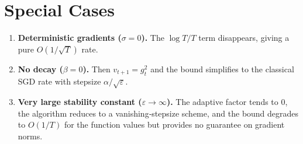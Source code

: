 \documentclass{article}
\begin{document}
\section*{Special Cases}
\begin{enumerate}[label=\alph*.]
\item \textbf{Deterministic gradients ($\sigma=0$).}  
The $\log T/T$ term disappears, giving a pure $O(1/\sqrt{T})$ rate.
\item \textbf{No decay ($\beta=0$).}  
Then $v_{t+1}=g_{t}^{2}$ and the bound simplifies to the classical SGD rate with stepsize
$\alpha/\sqrt{\varepsilon}$.
\item \textbf{Very large stability constant ($\varepsilon\to\infty$).}  
The adaptive factor tends to $0$, the algorithm reduces to a vanishing‑stepsize scheme,
and the bound degrades to $O(1/T)$ for the function values but provides no guarantee on gradient
norms.
\end{enumerate}
\end{document}

